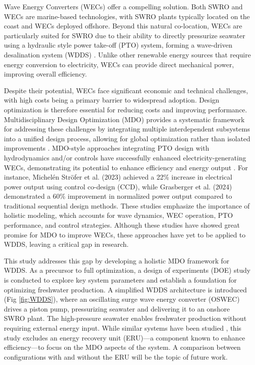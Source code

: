 \documentclass[twocolumn,10pt]{asme2e}
\begin{document}
Wave Energy Converters (WECs) offer a compelling solution. Both SWRO and WECs are marine-based technologies, with SWRO plants typically located on the coast and WECs deployed offshore. Beyond this natural co-location, WECs are particularly suited for SWRO \cite{blue_econ} due to their ability to directly pressurize seawater using a hydraulic style power take-off (PTO) system, forming a wave-driven desalination system (WDDS) \cite{Davies2005}. Unlike other renewable energy sources that require energy conversion to electricity, WECs can provide direct mechanical power, improving overall efficiency. 

Despite their potential, WECs face significant economic and technical challenges, with high costs being a primary barrier to widespread adoption. Design optimization is therefore essential for reducing costs and improving performance. Multidisciplinary Design Optimization (MDO) provides a systematic framework for addressing these challenges by integrating multiple interdependent subsystems into a unified design process, allowing for global optimization rather than isolated improvements \cite{Sobieski}. MDO-style approaches integrating PTO design with hydrodynamics and/or controls have successfully enhanced electricity-generating WECs, demonstrating its potential to enhance efficiency and energy output \cite{Stroefer2023,PenaSanchez2022,Rosati2023,Grasberger2024}. For instance, Michelén Ströfer et al. (2023) achieved a 22\% increase in electrical power output using control co-design (CCD), while Grasberger et al. (2024) demonstrated a 60\% improvement in normalized power output compared to traditional sequential design methods. These studies emphasize the importance of holistic modeling, which accounts for wave dynamics, WEC operation, PTO performance, and control strategies. Although these studies have showed great promise for MDO to improve WECs, these approaches have yet to be applied to WDDS, leaving a critical gap in research. 

This study addresses this gap by developing a holistic MDO framework for WDDS. As a precursor to full optimization, a design of experiments (DOE) study is conducted to explore key system parameters and establish a foundation for optimizing freshwater production. A simplified WDDS architecture is introduced (Fig \ref{fig:WDDS}), where an oscillating surge wave energy converter (OSWEC) drives a piston pump, pressurizing seawater and delivering it to an onshore SWRO plant. The high-pressure seawater enables freshwater production without requiring external energy input. While similar systems have been studied \cite{Yu2018,Suchithra2022,Mi2023,Simmons2024}, this study excludes an energy recovery unit (ERU)---a component known to enhance efficiency---to focus on the MDO aspects of the system. A comparison between configurations with and without the ERU will be the topic of future work.
\end{document}
